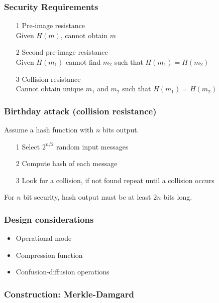 \documentclass[a4paper]{article}
\begin{document}
\subsubsection{Security Requirements}

\begin{enumerate}
  \item[1]
    Pre-image resistance \\
    Given $H(m)$, cannot obtain $m$
  \item[2]
    Second pre-image resistance \\
    Given $H(m_{1})$ cannot find $m_{2}$ such that $H(m_{1}) = H(m_{2})$
  \item[3]
    Collision resistance \\
    Cannot obtain unique $m_{1}$ and $m_{2}$ such that $H(m_{1}) = H(m_{2})$
\end{enumerate}

\subsubsection{Birthday attack (collision resistance)}

Assume a hash function with $n$ bits output.

\begin{enumerate}
  \item[1] Select $2^{n/2}$ random input messages
  \item[2] Compute hash of each message
  \item[3] Look for a collision, if not found repeat until a collision occurs
\end{enumerate}

For $n$ bit security, hash output must be at least $2n$ bits long.

\subsubsection{Design considerations}

\begin{itemize}
  \item Operational mode
  \item Compression function
  \item Confusion-diffusion operations
\end{itemize}

\subsubsection{Construction: Merkle-Damgard}
\end{document}
